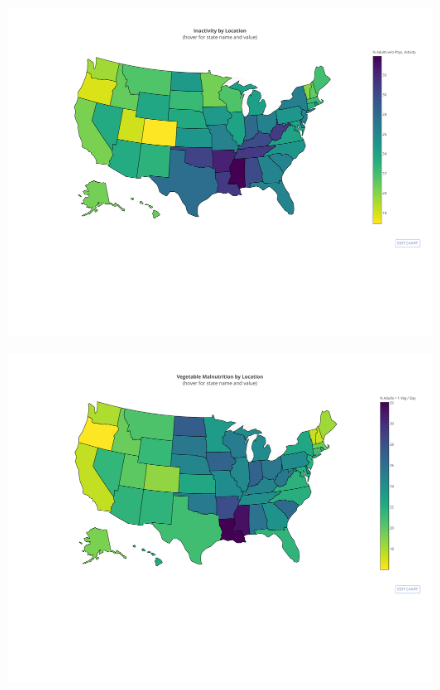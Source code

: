 \documentclass{article}
\begin{document}
\begin{figure}[h]
\centering
\caption{}
\includegraphics[width=\linewidth]{images/exploration_d3_map_inactive_adults.pdf}
\label{fig:inactivityByLocation}
\end{figure}
\begin{figure}[h]
\centering
\caption{}
\includegraphics[width=\linewidth]{images/exploration_d3_map_veg_mal_adults.pdf}
\label{fig:vegetableMalnutritionByLocation}
\end{figure}
\end{document}
